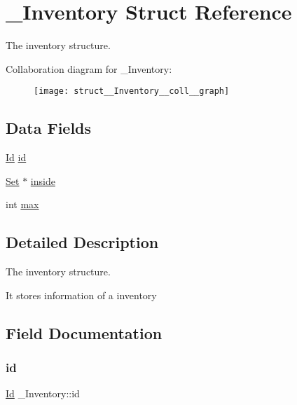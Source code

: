 \hypertarget{struct__Inventory}{}\section{\+\_\+\+Inventory Struct Reference}
\label{struct__Inventory}


The inventory structure.  




Collaboration diagram for \+\_\+\+Inventory\+:\nopagebreak
\begin{figure}[H]
\begin{center}
\leavevmode
\texttt{[image: struct\_\_Inventory\_\_coll\_\_graph]}
\end{center}
\end{figure}
\subsection*{Data Fields}
\begin{DoxyCompactItemize}
\item 
\hyperlink{types_8h_a845e604fb28f7e3d97549da3448149d3}{Id} \hyperlink{struct__Inventory_a73dcd4e1c702c8234092eac3ca2753f6}{id}
\item 
\hyperlink{set_8h_a6d3b7f7c92cbb4577ef3ef7ddbf93161}{Set} $\ast$ \hyperlink{struct__Inventory_ab6ad3d65f6119379be87edf22db640cb}{inside}
\item 
int \hyperlink{struct__Inventory_ac09bcf212b2c7ff348066b2e5f28bb9c}{max}
\end{DoxyCompactItemize}


\subsection{Detailed Description}
The inventory structure. 

It stores information of a inventory 

\subsection{Field Documentation}
\mbox{\label{struct__Inventory_a73dcd4e1c702c8234092eac3ca2753f6}} 
\subsubsection{\texorpdfstring{id}{id}}
{\footnotesize\ttfamily \hyperlink{types_8h_a845e604fb28f7e3d97549da3448149d3}{Id} \+\_\+\+Inventory\+::id}

